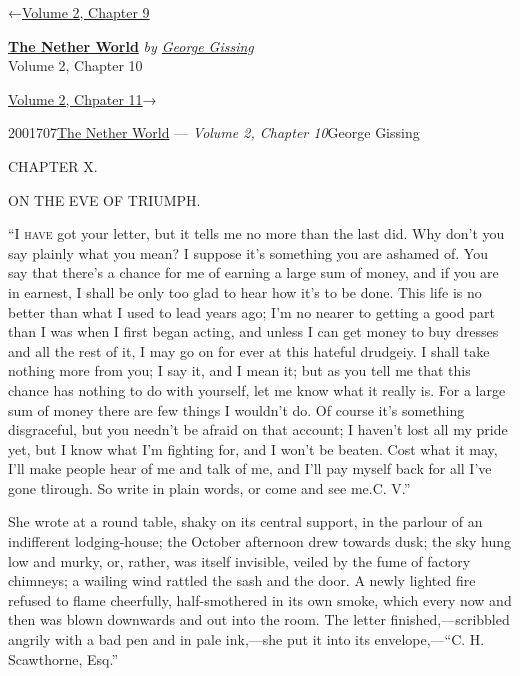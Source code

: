 \hypertarget{headerContainer}{}
\hypertarget{navigationHeader}{}
\protect\hypertarget{headerprevious}{}{←\href{/wiki/The_Nether_World/Volume_2/Chapter_9}{Volume
2, Chapter 9}}

\textbf{\protect\hypertarget{header_title_text}{}{\href{/wiki/The_Nether_World}{The
Nether World}}} \emph{by
\href{/wiki/Author:George_Gissing}{\protect\hypertarget{header_author_text}{}{{George
Gissing}}}}\\
\protect\hypertarget{header_section_text}{}{Volume 2, Chapter 10}

\protect\hypertarget{headernext}{}{\href{/wiki/The_Nether_World/Volume_2/Chapter_11}{Volume
2, Chpater 11}→}

\hypertarget{navigationNotes}{}

\hypertarget{ws-data}{}
\protect\hypertarget{ws-article-id}{}{2001707}\protect\hypertarget{ws-title}{}{\href{/wiki/The_Nether_World}{The
Nether World} --- \emph{Volume 2, Chapter
10}}\protect\hypertarget{ws-author}{}{George Gissing}

{\protect\hypertarget{195}{}{}}

{CHAPTER X.}

ON THE EVE OF TRIUMPH.

\textsc{``I have} got your letter, but it tells me no more than the last
did. Why don't you say plainly what you mean? I suppose it's something
you are ashamed of. You say that there's a chance for me of earning a
large sum of money, and if you are in earnest, I shall be only too glad
to hear how it's to be done. This life is no better than what I used to
lead years ago; I'm no nearer to getting a good part than I was when I
first began acting, and unless I can get money to buy dresses and all
the rest of it, I may go on for ever at this hateful drudgeiy. I shall
take nothing more from you; I say it, and I mean it; but as you tell me
that this chance has nothing to do with yourself, let me know what it
really is. For a large sum of money {\protect\hypertarget{196}{}{}}there
are few things I wouldn't do. Of course it's something disgraceful, but
you needn't be afraid on that account; I haven't lost all my pride yet,
but I know what I'm fighting for, and I won't be beaten. Cost what it
may, I'll make people hear of me and talk of me, and I'll pay myself
back for all I've gone tlirough. So write in plain words, or come and
see me.{C. V.''}

She wrote at a round table, shaky on its central support, in the parlour
of an indifferent lodging-house; the October afternoon drew towards
dusk; the sky hung low and murky, or, rather, was itself invisible,
veiled by the fume of factory chimneys; a wailing wind rattled the sash
and the door. A newly lighted fire refused to flame cheerfully,
half-smothered in its own smoke, which every now and then was blown
downwards and out into the room. The letter finished,---scribbled
angrily with a bad pen and in pale ink,---she put it into its
envelope,---``C. H. Scawthorne, Esq.''

